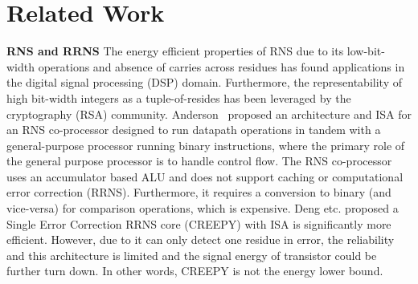 \documentclass{sig-alternate}
\begin{document}










\section{Related Work}
\label{sec:related}

\textbf{RNS and RRNS}
The energy efficient properties of RNS due to its low-bit-width operations and absence of carries across residues has found applications in the digital signal processing (DSP) \cite{Chokshi,Claudio,Ramirez} domain. Furthermore, the representability of high bit-width integers as a tuple-of-resides has been leveraged by the cryptography (RSA) \cite{bajard2004RSA,hung1994RSA,yen2003RSA} community. Anderson~\cite{AndersonThesis} proposed an architecture and ISA for an RNS co-processor designed to run datapath operations in tandem with a general-purpose processor running binary instructions, where the primary role of the general purpose processor is to handle control flow. The RNS co-processor uses an accumulator based ALU and does not support caching or computational error correction (RRNS). Furthermore, it requires a conversion to binary (and vice-versa) for comparison operations, which is expensive. Deng etc.\cite{DengTACO18} proposed a Single Error Correction RRNS core (CREEPY) with ISA is significantly more efficient. However, due to it can only detect one residue in error, the reliability and this architecture is limited and the signal energy of transistor could be further turn down. In other words, CREEPY is not the energy lower bound. 
\end{document}
